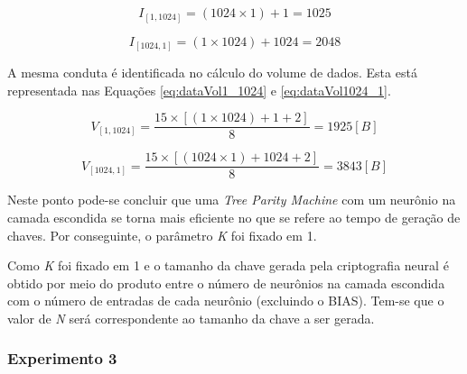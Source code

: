 \documentclass[a4paper,10pt,oneside,conference,final,keeplastbox]{inatel}
\begin{document}
                \begin{equation}
                    \label{eq:inputArray1_1024}
                    I_{[1, 1024]} = (1024 \times 1) + 1 = 1025
                \end{equation}

                \begin{equation}
                    \label{eq:inputArray1024_1}
                    I_{[1024, 1]} = (1 \times 1024) + 1024 = 2048
                \end{equation}
                
                A mesma conduta é identificada no cálculo do volume de dados. Esta está representada nas Equações \eqref{eq:dataVol1_1024} e \eqref{eq:dataVol1024_1}.
                
                \begin{equation}
                    \label{eq:dataVol1_1024}
                    V_{[1, 1024]} = \frac{15 \times [(1 \times 1024) + 1 + 2]}{8} = 1925 [B]
                \end{equation}

                \begin{equation}
                    \label{eq:dataVol1024_1}
                    V_{[1024, 1]} = \frac{15 \times [(1024 \times 1) + 1024 + 2]}{8} = 3843 [B]
                \end{equation}

                Neste ponto pode-se concluir que uma \textit{Tree Parity Machine} com um neurônio na camada escondida se torna mais eficiente no que se refere ao tempo de geração de chaves. Por conseguinte, o parâmetro \textit{K} foi fixado em 1.
                
                Como \textit{K} foi fixado em 1 e o tamanho da chave gerada pela criptografia neural é obtido por meio do produto entre o número de neurônios na camada escondida com o número de entradas de cada neurônio (excluindo o BIAS). Tem-se que o valor de \textit{N} será correspondente ao tamanho da chave a ser gerada.
                
            \subsubsection{Experimento 3}
            \label{subsubsec:experimentoEpsilon}
\end{document}
